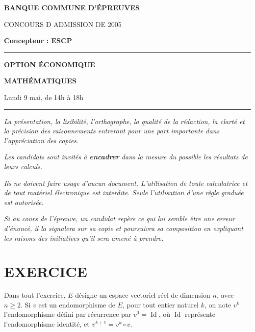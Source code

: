 \documentclass[11pt]{article}%
\begin{document}

\begin{center}
{\LARG\E\textbf{BANQUE COMMUNE D'ÉPREUVES}}



{\large \textsc{CONCOURS D ADMISSION DE 2005}}



{\large \textbf{Concepteur : ESCP}}



\rule{2.39cm}{0.05cm}



{\Large \textbf{OPTION ÉCONOMIQUE}}



{\Large \textbf{MATHÉMATIQUES }}



{\Large Lundi 9 mai, de 14h à 18h}



\rule{2.39cm}{0.05cm}
\end{center}

\textit{La présentation, la lisibilité, l'orthographe, la qualité
de la rédaction, la clarté et la précision des raisonnements
entreront pour une part importante dans l'appréciation des copies.}

\textit{Les candidats sont invités à \textbf{encadrer} dans la mesure
du possible les résultats de leurs calculs.}

\textit{Ils ne doivent faire usage d'aucun document. L'utilisation de
toute
calculatrice et de tout matériel électronique est interdite. Seule
l'utilisation d'une règle graduée est autorisée.}

\textit{Si au cours de l'épreuve, un candidat repère ce qui lui semble
être une erreur d'énoncé, il la signalera sur sa copie et
poursuivra sa composition en expliquant les raisons des initiatives
qu'il sera
amené à prendre.}

\vspace*{3cm}

\section*{EXERCICE}

Dans tout l'exercice, $E$ désigne un espace vectoriel réel de dimension
$n$,
avec $n\geq 2$. Si $v$ est un endomorphisme de $E$, pour tout entier
naturel $k$, on note $v^{k}$ l'endomorphisme défini par récurrence par
$v^{0} = \operatorname{Id}$, où $\operatorname{Id}$ représente
l'endomorphisme identité, et $v^{k + 1} = v^{k}\circ v$.
\end{document}
